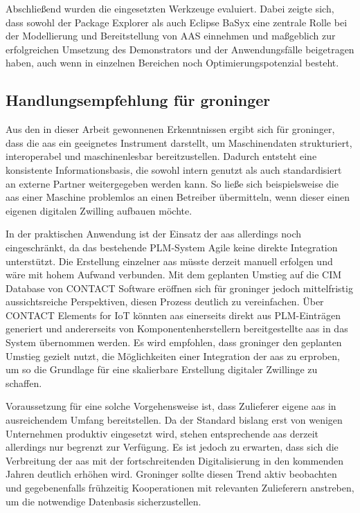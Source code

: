 Abschließend wurden die eingesetzten Werkzeuge evaluiert. 
Dabei zeigte sich, dass sowohl der Package Explorer als auch Eclipse BaSyx eine zentrale Rolle bei der Modellierung und Bereitstellung von AAS einnehmen und maßgeblich zur erfolgreichen Umsetzung des Demonstrators und der Anwendungsfälle beigetragen haben, auch wenn in einzelnen Bereichen noch Optimierungspotenzial besteht.

\newpage
\subsection{Handlungsempfehlung für groninger}

Aus den in dieser Arbeit gewonnenen Erkenntnissen ergibt sich für groninger, dass die \acs{aas} ein geeignetes Instrument darstellt, um Maschinendaten strukturiert, interoperabel und maschinenlesbar bereitzustellen. 
Dadurch entsteht eine konsistente Informationsbasis, die sowohl intern genutzt als auch standardisiert an externe Partner weitergegeben werden kann. 
So ließe sich beispielsweise die \acs{aas} einer Maschine problemlos an einen Betreiber übermitteln, wenn dieser einen eigenen digitalen Zwilling aufbauen möchte.

In der praktischen Anwendung ist der Einsatz der \acs{aas} allerdings noch eingeschränkt, da das bestehende PLM-System Agile keine direkte Integration unterstützt. 
Die Erstellung einzelner \acs{aas} müsste derzeit manuell erfolgen und wäre mit hohem Aufwand verbunden.
Mit dem geplanten Umstieg auf die CIM Database von CONTACT Software eröffnen sich für groninger jedoch mittelfristig aussichtsreiche Perspektiven, diesen Prozess deutlich zu vereinfachen. 
Über CONTACT Elements for IoT \cite{CONTACT} könnten \acs{aas} einerseits direkt aus PLM-Einträgen generiert und andererseits von Komponentenherstellern bereitgestellte \acs{aas} in das System übernommen werden. 
Es wird empfohlen, dass groninger den geplanten Umstieg gezielt nutzt, die Möglichkeiten einer Integration der \acs{aas} zu erproben, um so die Grundlage für eine skalierbare Erstellung digitaler Zwillinge zu schaffen.

Voraussetzung für eine solche Vorgehensweise ist, dass Zulieferer eigene \acs{aas} in ausreichendem Umfang bereitstellen. 
Da der Standard bislang erst von wenigen Unternehmen produktiv eingesetzt wird, stehen entsprechende \acs{aas} derzeit allerdings nur begrenzt zur Verfügung. 
Es ist jedoch zu erwarten, dass sich die Verbreitung der \acs{aas} mit der fortschreitenden Digitalisierung in den kommenden Jahren deutlich erhöhen wird. 
Groninger sollte diesen Trend aktiv beobachten und gegebenenfalls frühzeitig Kooperationen mit relevanten Zulieferern anstreben, um die notwendige Datenbasis sicherzustellen.

